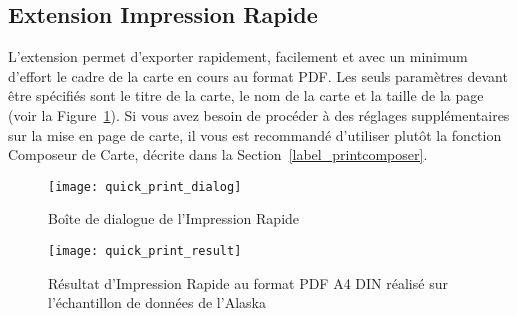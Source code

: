 
\subsection{Extension Impression Rapide}


L'extension  permet d'exporter 
rapidement, facilement et avec un minimum d'effort le cadre de la carte en 
cours au format PDF. Les seuls paramètres devant être spécifiés sont le titre 
de la carte, le nom de la carte et la taille de la page (voir la Figure~\ref{fig:quickprint}). 
Si vous avez besoin de procéder à des réglages supplémentaires sur la mise en 
page de carte, il vous est recommandé d'utiliser plutôt la fonction Composeur 
de Carte, décrite dans la Section~\ref{label_printcomposer}.

\begin{figure}[ht]
   \begin{center}
   \caption{Boîte de dialogue de l'Impression Rapide \nixcaption}\label{fig:quickprint}\smallskip
   \texttt{[image: quick\_print\_dialog]}
\end{center}
\end{figure}

\begin{figure}[ht]
   \begin{center}
   \caption{Résultat d'Impression Rapide au format PDF A4 DIN réalisé sur 
   l'échantillon de données de l'Alaska\nixcaption}\label{fig:quickprint_result}\smallskip
   \texttt{[image: quick\_print\_result]}
\end{center}
\end{figure}
